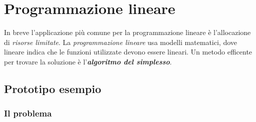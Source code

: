 \documentclass{article}
\begin{document}
  \section{Programmazione lineare}
    In breve l'applicazione più comune per la programmazione lineare è l'allocazione di \textit{risorse limitate}. La \textit{programmazione lineare} usa modelli matematici, dove lineare indica che le funzioni utilizzate devono essere lineari. Un metodo efficente per trovare la soluzione è l'\textbf{\textit{algoritmo del simplesso}}.

  \subsection{Prototipo esempio}
    \subsubsection{Il problema} 
\end{document}
